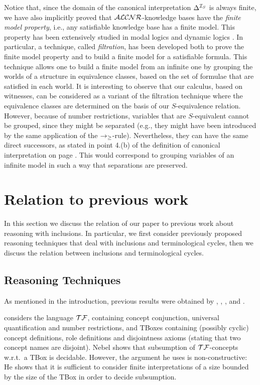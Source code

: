 Notice that, since the domain of the canonical interpretation 
$\Delta^{{\cal I}_S}$ is always finite, we have also implicitly proved that 
${\cal ALCNR}$-knowledge bases have the {\em finite model property},
i.e., any satisfiable knowledge base has a finite model.
This property has been extensively studied in modal 
logics \cite{HuCr84} and dynamic 
logics \cite{Hare84}.
In particular, a technique, called {\em filtration}, has
been developed both to prove the finite model property and 
to build a finite model for a satisfiable formula. This technique allows
one to build a finite model from an infinite one by grouping the worlds
of a structure in equivalence classes, based on the set of formulae 
that are satisfied in each world.
It is interesting to observe that our calculus, 
based on witnesses, can be considered as a variant of
the filtration technique where the equivalence classes are determined
on the basis of our $S$-equivalence relation.
However, because of number restrictions, variables that are
$S$-equivalent cannot be grouped, since they might be
separated (e.g., they might have been introduced by the
same application of the $\rightarrow_\geq$-rule). Nevertheless,
they can have the same direct successors, as stated in point
4.(b) of the definition of canonical interpretation on page
\pageref{can-int}.
This would correspond to grouping variables of an infinite model
in such a way that separations are preserved.
\section{Relation to previous work}\label{sec-prevwork}

In this section we discuss the relation of our paper to previous 
work about reasoning with inclusions. In particular, we first consider previously proposed
reasoning techniques that deal with inclusions and terminological cycles, then 
we discuss the relation between inclusions and terminological cycles.

\subsection{Reasoning Techniques}\label{reasoning-techniques}
As mentioned in the introduction, previous results were obtained by
,
,
,
 and 
.

 considers the language ${\cal TF}$, 
containing concept conjunction,
universal quantification and number restrictions, and TBoxes containing
(possibly cyclic) concept definitions, role definitions and disjointness axioms
(stating that two concept names are disjoint).  Nebel shows that
subsumption of ${\cal TF}$-concepts w.r.t.\ a TBox is decidable.  However, the
argument he uses is non-constructive: He shows that it is sufficient to
consider finite interpretations of a size bounded by the size of the TBox in
order to decide subsumption.

